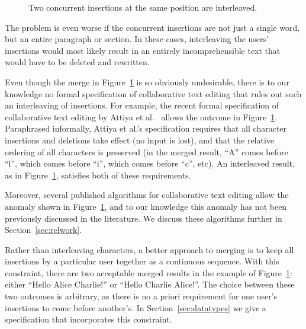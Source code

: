 \begin{figure}
\centering
{}
\caption{Two concurrent insertions at the same position are interleaved.}\label{fig:bad-merge}
\end{figure}

The problem is even worse if the concurrent insertions are not just a single word, but an entire paragraph or section.
In these cases, interleaving the users' insertions would most likely result in an entirely incomprehensible text that would have to be deleted and rewritten.

Even though the merge in Figure~\ref{fig:bad-merge} is so obviously undesirable, there is to our knowledge no formal specification of collaborative text editing that rules out such an interleaving of insertions.
For example, the recent formal specification of collaborative text editing by Attiya et al.~\cite{Attiya:2016kh} allows the outcome in Figure~\ref{fig:bad-merge}.
Paraphrased informally, Attiya et al.'s specification requires that all character insertions and deletions take effect (no input is lost), and that the relative ordering of all characters is preserved (in the merged result, ``A'' comes before ``l'', which comes before ``i'', which comes before ``c'', etc).
An interleaved result, as in Figure~\ref{fig:bad-merge}, satisfies both of these requirements.

Moreover, several published algorithms for collaborative text editing allow the anomaly shown in Figure~\ref{fig:bad-merge}, and to our knowledge this anomaly has not been previously discussed in the literature.
We discuss these algorithms further in Section~\ref{sec:relwork}.

Rather than interleaving characters, a better approach to merging is to keep all insertions by a particular user together as a continuous sequence.
With this constraint, there are two acceptable merged results in the example of Figure~\ref{fig:bad-merge}: either ``Hello Alice Charlie!'' or ``Hello Charlie Alice!''.
The choice between these two outcomes is arbitrary, as there is no a priori requirement for one user's insertions to come before another's.
In Section~\ref{sec:datatypes} we give a specification that incorporates this constraint.

